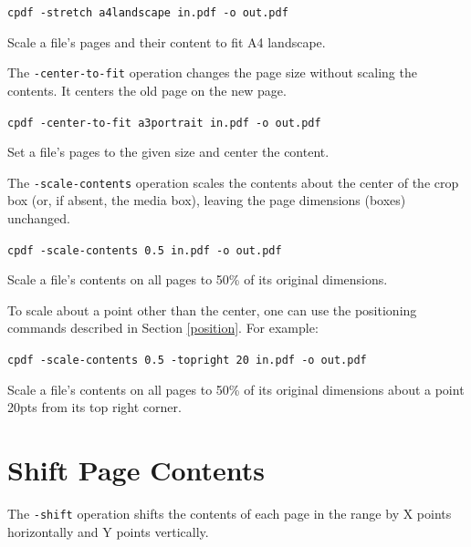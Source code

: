 \documentclass{book}
\begin{document}
  \begin{framed}
  \small\noindent\verb!cpdf -stretch a4landscape in.pdf -o out.pdf!

  \vspace{2.5mm}
  \noindent Scale a file's pages and their content to fit A4 landscape.
  \end{framed}

\noindent The \texttt{-center-to-fit} operation changes the page size without scaling the contents. It centers the old page on the new page.

  \begin{framed}
  \small\noindent\verb!cpdf -center-to-fit a3portrait in.pdf -o out.pdf!

  \vspace{2.5mm}
  \noindent Set a file's pages to the given size and center the content.
  \end{framed}


\noindent The \texttt{-scale-contents} operation scales the contents about the center
  of the crop box (or, if absent, the media box), leaving the page dimensions
  (boxes) unchanged.

  \begin{framed}
  \small\noindent\verb!cpdf -scale-contents 0.5 in.pdf -o out.pdf!

  \vspace{2.5mm}
  \noindent Scale a file's contents on all pages to 50\% of its original dimensions.
  \end{framed}

  \noindent To scale about a point other than the center, one can use the positioning commands described in Section \ref{position}. For example:
  
  \begin{framed}
  \small\noindent\verb!cpdf -scale-contents 0.5 -topright 20 in.pdf -o out.pdf!

  \vspace{2.5mm}
  \noindent Scale a file's contents on all pages to 50\% of its original dimensions about a point 20pts from its top right corner.
  \end{framed}

  

  \section{Shift Page Contents}

  The \texttt{-shift} operation shifts the contents of each page in the range
by X points horizontally and Y points vertically.
\end{document}
